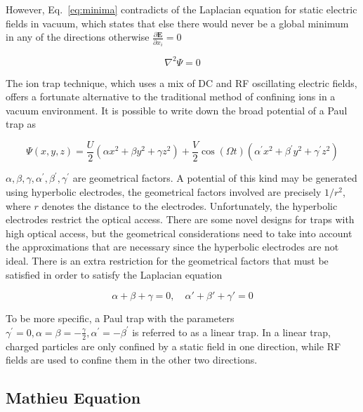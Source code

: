 However, Eq.~\eqref{eq:minima} contradicts of the Laplacian equation for static electric fields in vacuum, which states that else there would never be a global minimum in any of the directions otherwise $\frac{\partial \mathbf{E}}{\partial x_i}=0$

\begin{equation}
    \nabla^2 \Psi=0
\end{equation}


The ion trap technique, which uses a mix of DC and RF oscillating electric fields, offers a fortunate alternative to the traditional method of confining ions in a vacuum environment. It is possible to write down the broad potential of a Paul trap as

\begin{equation}\label{eq:rfpotential}
    \Psi(x, y, z)=\frac{U}{2}\left(\alpha x^2+\beta y^2+\gamma z^2\right)+\frac{V}{2} \cos (\Omega t)\left(\alpha^{\prime} x^2+\beta^{\prime} y^2+\gamma^{\prime} z^2\right)
\end{equation}

$\alpha, \beta, \gamma, \alpha^{\prime}, \beta^{\prime}, \gamma^{\prime}$ are geometrical factors. A potential of this kind may be generated using hyperbolic electrodes, the geometrical factors involved are precisely $1 / r^2$, where $r$ denotes the distance to the electrodes. Unfortunately, the hyperbolic electrodes restrict the optical access. There are some novel designs for traps with high optical access, but the geometrical considerations need to take into account the approximations that are necessary since the hyperbolic electrodes are not ideal. There is an extra restriction for the geometrical factors that must be satisfied in order to satisfy the Laplacian equation

\begin{equation}
    \alpha+\beta+\gamma=0,\quad \alpha'+\beta'+\gamma'=0
\end{equation}

To be more specific, a Paul trap with the parameters $\gamma^{\prime}=0, \alpha=\beta=-\frac{\gamma}{2}, \alpha^{\prime}=-\beta^{\prime}$ is referred to as a linear trap. In a linear trap, charged particles are only confined by a static field in one direction, while RF fields are used to confine them in the other two directions.

\subsection{Mathieu Equation}

